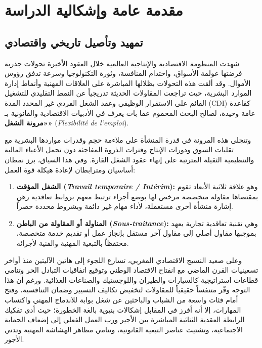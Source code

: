 
\chapter*{مقدمة عامة وإشكالية الدراسة}

\section*{تمهيد وتأصيل تاريخي واقتصادي}

شهدت المنظومة الاقتصادية والإنتاجية العالمية خلال العقود الأخيرة تحولات جذرية فرضتها عولمة الأسواق، واحتدام المنافسة، وثورة التكنولوجيا وسرعة تدفق رؤوس الأموال. وقد ألقت هذه التحولات بظلالها المباشرة على العلاقات المهنية وأنماط إدارة الموارد البشرية، حيث تراجعت المقاولات الحديثة تدريجياً عن النمط التقليدي للتشغيل القائم على الاستقرار الوظيفي وعقد الشغل الفردي غير المحدد المدة (CDI) كقاعدة عامة وحيدة، لصالح البحث المحموم عما بات يعرف في الأدبيات الاقتصادية والقانونية بـ \textbf{«مرونة الشغل»} (\textit{Flexibilité de l'emploi}).

وتتجلى هذه المرونة في قدرة المنشأة على ملاءمة حجم وقدرات مواردها البشرية مع تقلبات السوق ودورات الإنتاج وفترات الذروة المفاجئة دون تحمل الأعباء المالية والتنظيمية الثقيلة المترتبة على إنهاء عقود الشغل القارة. وفي هذا السياق، برز نمطان أساسيان ومترابطان لإعادة هيكلة قوة العمل:
\begin{enumerate}
    \item \textbf{الشغل المؤقت (\textit{Travail temporaire / Intérim}):} وهو علاقة ثلاثية الأبعاد تقوم بمقتضاها مقاولة متخصصة مرخص لها بوضع أجراء ترتبط معهم بروابط تعاقدية رهن إشارة منشأة أخرى مستعملة، لأداء مهام غير دائمة وبشروط محددة حصراً.
    \item \textbf{المناولة أو المقاولة من الباطن (\textit{Sous-traitance}):} وهي تقنية تعاقدية تجارية يعهد بموجبها مقاول أصلي إلى مقاول آخر مستقل بإنجاز عمل أو تقديم خدمة متخصصة، محتفظاً بالتبعية المهنية والفنية لأجرائه.
\end{enumerate}

وعلى صعيد النسيج الاقتصادي المغربي، تسارع اللجوء إلى هاتين الآليتين منذ أواخر تسعينيات القرن الماضي مع انفتاح الاقتصاد الوطني وتوقيع اتفاقيات التبادل الحر وتنامي قطاعات استراتيجية كالسيارات والطيران واللوجستيك والصناعات الغذائية. ورغم أن هذا التوجه وفّر متنفساً حقيقياً للمقاولات لتخفيض تكاليف التسيير وضمان التنافسية، وفتح أمام فئات واسعة من الشباب والباحثين عن شغل بوابة للاندماج المهني واكتساب المهارات، إلا أنه أفرز في المقابل إشكالات بنيوية بالغة الخطورة؛ حيث أدى تفكيك الرابطة العقدية الثنائية المباشرة بين الأجير ورب العمل الفعلي إلى إضعاف الحماية الاجتماعية، وتشتيت عناصر التبعية القانونية، وتنامي مظاهر الهشاشة المهنية وتدني الأجور.

